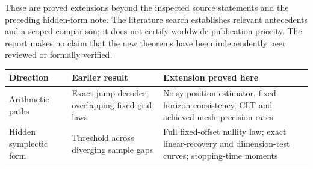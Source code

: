 These are proved extensions beyond the inspected source statements and the preceding hidden-form note. The literature search establishes relevant antecedents and a scoped comparison; it does not certify worldwide publication priority. The report makes no claim that the new theorems have been independently peer reviewed or formally verified.

\begin{center}
\small
\begin{tabular}{@{}>{\raggedright\arraybackslash}p{.22\linewidth}>{\raggedright\arraybackslash}p{.34\linewidth}>{\raggedright\arraybackslash}p{.35\linewidth}@{}}
\toprule
Direction & Earlier result & Extension proved here\\
\midrule
Arithmetic paths & Exact jump decoder; overlapping fixed-grid laws & Noisy position estimator, fixed-horizon consistency, CLT and achieved mesh--precision rates\\[4pt]
Hidden symplectic form & Threshold across diverging sample gaps & Full fixed-offset nullity law; exact linear-recovery and dimension-test curves; stopping-time moments\\
\bottomrule
\end{tabular}
\end{center}
